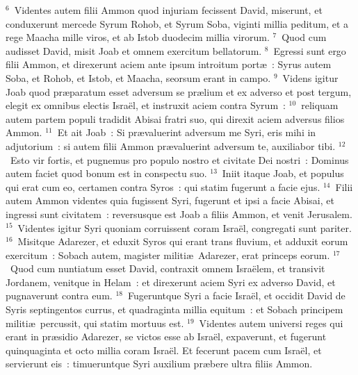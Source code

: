 ${}^{6}$~Videntes autem filii Ammon quod injuriam fecissent David, miserunt, et conduxerunt mercede Syrum Rohob, et Syrum Soba, viginti millia peditum, et a rege Maacha mille viros, et ab Istob duodecim millia virorum.
${}^{7}$~Quod cum audisset David, misit Joab et omnem exercitum bellatorum.
${}^{8}$~Egressi sunt ergo filii Ammon, et direxerunt aciem ante ipsum introitum port\ae~: Syrus autem Soba, et Rohob, et Istob, et Maacha, seorsum erant in campo.
${}^{9}$~Videns igitur Joab quod pr\ae paratum esset adversum se pr\ae lium et ex adverso et post tergum, elegit ex omnibus electis Isra\"el, et instruxit aciem contra Syrum~:
${}^{10}$~reliquam autem partem populi tradidit Abisai fratri suo, qui direxit aciem adversus filios Ammon.
${}^{11}$~Et ait Joab~: Si pr\ae valuerint adversum me Syri, eris mihi in adjutorium~: si autem filii Ammon pr\ae valuerint adversum te, auxiliabor tibi.
${}^{12}$~Esto vir fortis, et pugnemus pro populo nostro et civitate Dei nostri~: Dominus autem faciet quod bonum est in conspectu suo.
${}^{13}$~Iniit itaque Joab, et populus qui erat cum eo, certamen contra Syros~: qui statim fugerunt a facie ejus.
${}^{14}$~Filii autem Ammon videntes quia fugissent Syri, fugerunt et ipsi a facie Abisai, et ingressi sunt civitatem~: reversusque est Joab a filiis Ammon, et venit Jerusalem.
${}^{15}$~Videntes igitur Syri quoniam corruissent coram Isra\"el, congregati sunt pariter.
${}^{16}$~Misitque Adarezer, et eduxit Syros qui erant trans fluvium, et adduxit eorum exercitum~: Sobach autem, magister militi\ae\ Adarezer, erat princeps eorum.
${}^{17}$~Quod cum nuntiatum esset David, contraxit omnem Isra\"elem, et transivit Jordanem, venitque in Helam~: et direxerunt aciem Syri ex adverso David, et pugnaverunt contra eum.
${}^{18}$~Fugeruntque Syri a facie Isra\"el, et occidit David de Syris septingentos currus, et quadraginta millia equitum~: et Sobach principem militi\ae\ percussit, qui statim mortuus est.
${}^{19}$~Videntes autem universi reges qui erant in pr\ae sidio Adarezer, se victos esse ab Isra\"el, expaverunt, et fugerunt quinquaginta et octo millia coram Isra\"el. Et fecerunt pacem cum Isra\"el, et servierunt eis~: timueruntque Syri auxilium pr\ae bere ultra filiis Ammon.

